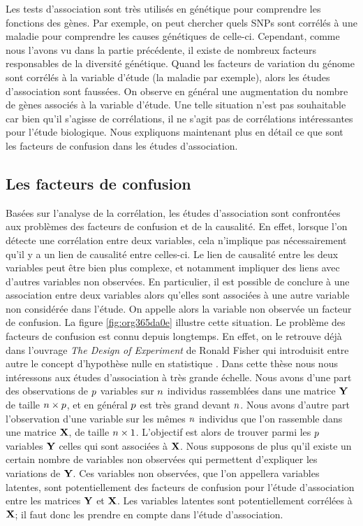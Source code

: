 \documentclass[12pt,a4paper,twoside]{ugathesis}
\begin{document}
Les tests d'association sont très utilisés en génétique pour comprendre les
fonctions des gènes. Par exemple, on peut chercher quels SNPs sont corrélés à
une maladie pour comprendre les causes génétiques de celle-ci. Cependant, comme
nous l'avons vu dans la partie précédente, il existe de nombreux facteurs
responsables de la diversité génétique. Quand les facteurs de variation du
génome sont corrélés à la variable d'étude (la maladie par exemple), alors les
études d'association sont faussées. On observe en général une augmentation du
nombre de gènes associés à la variable d'étude. Une telle situation n'est pas
souhaitable car bien qu'il s'agisse de corrélations, il ne s'agit pas de
corrélations intéressantes pour l'étude biologique. Nous expliquons maintenant
plus en détail ce que sont les facteurs de confusion dans les études
d'association.

\subsection{Les facteurs de confusion}
\label{sec:org3e64c24}
\label{org877b304}

Basées sur l'analyse de la corrélation, les études d'association sont
confrontées aux problèmes des facteurs de confusion et de la causalité. En
effet, lorsque l'on détecte une corrélation entre deux variables, cela
n'implique pas nécessairement qu'il y a un lien de causalité entre celles-ci. Le
lien de causalité entre les deux variables peut être bien plus complexe, et
notamment impliquer des liens avec d'autres variables non observées. En
particulier, il est possible de conclure à une association entre deux variables
alors qu'elles sont associées à une autre variable non considérée dans l'étude.
On appelle alors la variable non observée un facteur de confusion. La figure
\ref{fig:org365da0e} illustre cette situation. Le problème des facteurs de
confusion est connu depuis longtemps. En effet, on le retrouve déjà dans
l'ouvrage \emph{The Design of Experiment} de Ronald Fisher qui introduisit entre
autre le concept d'hypothèse nulle en statistique \citep{fisher1937design}. Dans
cette thèse nous nous intéressons aux études d'association à très grande
échelle. Nous avons d'une part des observations de \(p\) variables sur \(n\)
individus rassemblées dans une matrice \(\mathbf{Y}\) de taille \(n \times p\), et
en général \(p\) est très grand devant \(n\). Nous avons d'autre part
l'observation d'une variable sur les mêmes \(n\) individus que l'on rassemble
dans une matrice \(\mathbf{X}\), de taille \(n \times 1\). L'objectif est alors de
trouver parmi les \(p\) variables \(\mathbf{Y}\) celles qui sont associées à \(\mathbf{X}\). Nous
supposons de plus qu'il existe un certain nombre de variables non observées qui
permettent d'expliquer les variations de \(\mathbf{Y}\). Ces variables non observées, que
l'on appellera variables latentes, sont potentiellement des facteurs de
confusion pour l'étude d'association entre les matrices \(\mathbf{Y}\) et \(\mathbf{X}\). Les
variables latentes sont potentiellement corrélées à \(\mathbf{X}\); il faut donc les
prendre en compte dans l'étude d'association.
\end{document}
